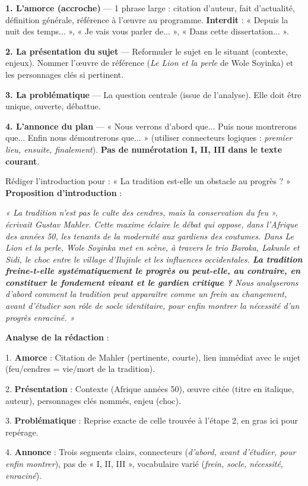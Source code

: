 \documentclass[11pt]{article}
\newcommand{\cle}[1]{{\popxbold\color{popdark}#1}}
\begin{document}
\begin{methode}
\textbf{1. L'amorce (accroche)} — 1 phrase large : citation d'auteur, fait d'actualité, définition générale, référence à l'œuvre au programme. \textbf{Interdit} : « Depuis la nuit des temps... », « Je vais vous parler de... », « Dans cette dissertation... ».\par
\textbf{2. La présentation du sujet} — Reformuler le sujet en le situant (contexte, enjeux). Nommer l'œuvre de référence (\emph{Le Lion et la perle} de Wole Soyinka) et les personnages clés si pertinent.\par
\textbf{3. La problématique} — La question centrale (issue de l'analyse). Elle doit être \cle{unique}, \cle{ouverte}, \cle{débattue}.\par
\textbf{4. L'annonce du plan} — « Nous verrons d'abord que... Puis nous montrerons que... Enfin nous démontrerons que... » (utiliser \cle{connecteurs logiques} : \emph{premier lieu, ensuite, finalement}). \textbf{Pas de numérotation I, II, III dans le texte courant}.
\end{methode}

\begin{exoresolu}{Rédiger l'introduction pour : « La tradition est-elle un obstacle au progrès ? »}
\textbf{Proposition d'introduction} :\par
\emph{« La tradition n'est pas le culte des cendres, mais la conservation du feu », écrivait Gustav Mahler. Cette maxime éclaire le débat qui oppose, dans l'Afrique des années 50, les tenants de la modernité aux gardiens des coutumes. Dans \emph{Le Lion et la perle}, Wole Soyinka met en scène, à travers le trio Baroka, Lakunle et Sidi, le choc entre le village d'Ilujinle et les influences occidentales. \textbf{La tradition freine-t-elle systématiquement le progrès ou peut-elle, au contraire, en constituer le fondement vivant et le gardien critique ?} Nous analyserons d'abord comment la tradition peut apparaître comme un frein au changement, avant d'étudier son rôle de socle identitaire, pour enfin montrer la nécessité d'un progrès enraciné. »}\par
\tcblower
\textbf{Analyse de la rédaction} :\par
1. \textbf{Amorce} : Citation de Mahler (pertinente, courte), lien immédiat avec le sujet (feu/cendres = vie/mort de la tradition).\par
2. \textbf{Présentation} : Contexte (Afrique années 50), œuvre citée (titre en italique, auteur), personnages clés nommés, enjeu (choc).\par
3. \textbf{Problématique} : Reprise exacte de celle trouvée à l'étape 2, en gras ici pour repérage.\par
4. \textbf{Annonce} : Trois segments clairs, connecteurs (\emph{d'abord, avant d'étudier, pour enfin montrer}), pas de « I, II, III », vocabulaire varié (\emph{frein, socle, nécessité, enraciné}).
\end{exoresolu}
\end{document}
